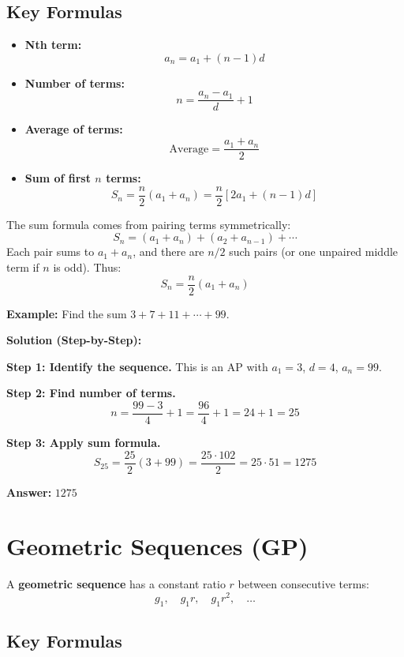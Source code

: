 \documentclass[12pt]{extarticle}
\begin{document}
\subsection*{Key Formulas}

\begin{itemize}
\item \textbf{Nth term:}
\[
a_n = a_1 + (n-1)d
\]

\item \textbf{Number of terms:}
\[
n = \frac{a_n - a_1}{d} + 1
\]

\item \textbf{Average of terms:}
\[
\text{Average} = \frac{a_1 + a_n}{2}
\]

\item \textbf{Sum of first $n$ terms:}
\[
S_n = \frac{n}{2}(a_1 + a_n) = \frac{n}{2}[2a_1 + (n-1)d]
\]
\end{itemize}

\begin{conceptbox}
The sum formula comes from pairing terms symmetrically:
\[
S_n = (a_1 + a_n) + (a_2 + a_{n-1}) + \cdots
\]
Each pair sums to $a_1 + a_n$, and there are $n/2$ such pairs (or one unpaired middle term if $n$ is odd). Thus:
\[
S_n = \frac{n}{2}(a_1 + a_n)
\]
\end{conceptbox}

\begin{examplebox}
\textbf{Example:} Find the sum $3 + 7 + 11 + \cdots + 99$.

\textbf{Solution (Step-by-Step):}

\textbf{Step 1: Identify the sequence.} This is an AP with $a_1=3$, $d=4$, $a_n=99$.

\textbf{Step 2: Find number of terms.}
\[
n = \frac{99-3}{4} + 1 = \frac{96}{4} + 1 = 24 + 1 = 25
\]

\textbf{Step 3: Apply sum formula.}
\[
S_{25} = \frac{25}{2}(3+99) = \frac{25 \cdot 102}{2} = 25 \cdot 51 = 1275
\]

\textbf{Answer:} $\boxed{1275}$
\end{examplebox}

\section{Geometric Sequences (GP)}

A \textbf{geometric sequence} has a constant ratio $r$ between consecutive terms:
\[
g_1, \quad g_1r, \quad g_1r^2, \quad \dots
\]

\subsection*{Key Formulas}
\end{document}
